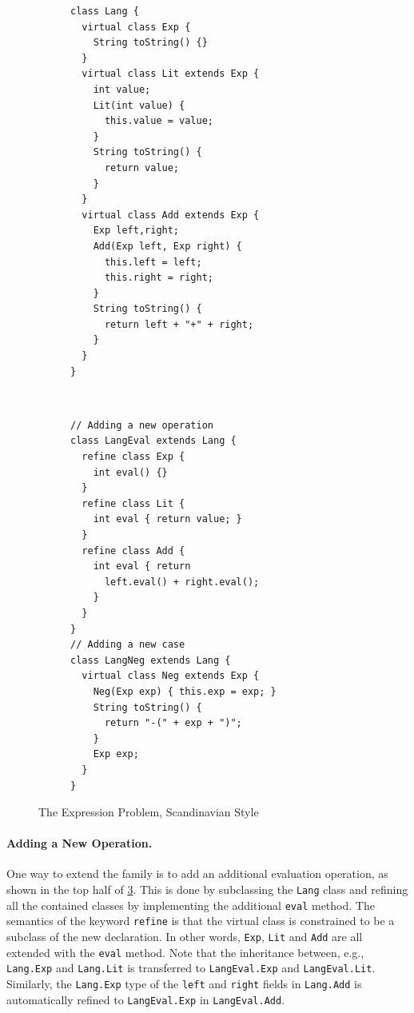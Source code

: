 \begin{figure}[t]
    \centering
    \begin{subfigure}[b]{0.45\textwidth}
\begin{lstlisting}[language=gbeta]
class Lang {
  virtual class Exp {
    String toString() {}
  }
  virtual class Lit extends Exp {
    int value;
    Lit(int value) {
      this.value = value;
    }
    String toString() {
      return value;
    }
  }
  virtual class Add extends Exp {
    Exp left,right;
    Add(Exp left, Exp right) {
      this.left = left;
      this.right = right;
    }
    String toString() {
      return left + "+" + right;
    }
  }
}
\end{lstlisting}
 \label{fig:lang}
    \end{subfigure} ~
    \begin{subfigure}[b]{0.5\textwidth}
\begin{lstlisting}[language=gbeta,  xleftmargin=1mm]
// Adding a new operation
class LangEval extends Lang {
  refine class Exp {
    int eval() {}
  }
  refine class Lit {
    int eval { return value; }
  }
  refine class Add {
    int eval { return
      left.eval() + right.eval();
    }
  }
}
// Adding a new case
class LangNeg extends Lang {
  virtual class Neg extends Exp {
    Neg(Exp exp) { this.exp = exp; }
    String toString() {
      return "-(" + exp + ")";
    }
    Exp exp;
  }
}
\end{lstlisting}
 \label{fig:extend}
    \end{subfigure}
    \caption{The Expression Problem, Scandinavian Style}
\end{figure}

\paragraph{Adding a New Operation.}

One way to extend the family is to add an additional evaluation operation, as
shown in the top half of \cref{fig:extend}. This is done by subclassing the
\lstinline{Lang} class and refining all the contained classes by implementing
the additional \lstinline{eval} method. The semantics of the keyword
\lstinline[language=gbeta]{refine} is that the virtual class is constrained to
be a subclass of the new declaration. In other words, \lstinline{Exp},
\lstinline{Lit} and \lstinline{Add} are all extended with the \lstinline{eval}
method. Note that the inheritance between, e.g., \lstinline{Lang.Exp} and
\lstinline{Lang.Lit} is transferred to \lstinline{LangEval.Exp} and
\lstinline{LangEval.Lit}. Similarly, the \lstinline{Lang.Exp} type of the
\lstinline{left} and \lstinline{right} fields in \lstinline{Lang.Add} is
automatically refined to \lstinline{LangEval.Exp} in \lstinline{LangEval.Add}.

